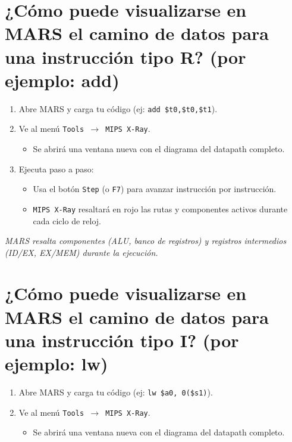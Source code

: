 \documentclass{article}
\begin{document}
\begin{itemize}
\begin{itemize}[label=--]
\begin{enumerate}[leftmargin=*]
\end{enumerate}

\section{¿Cómo puede visualizarse en MARS el camino de datos para una instrucción tipo R? (por ejemplo: add)}

\begin{enumerate}
    \item Abre MARS y carga tu código (ej: \texttt{add \$t0,\$t0,\$t1}).
    
    \item Ve al menú \texttt{Tools $\rightarrow$ MIPS X-Ray}.
    
    \begin{itemize}
        \item Se abrirá una ventana nueva con el diagrama del datapath completo.
    \end{itemize}
    
    \item Ejecuta paso a paso:
    \begin{itemize}
        \item Usa el botón \texttt{Step} (o \texttt{F7}) para avanzar instrucción por instrucción.
        \item \texttt{MIPS X-Ray} resaltará en rojo las rutas y componentes activos durante cada ciclo de reloj.
    \end{itemize}
\end{enumerate}
\textit{MARS resalta componentes (ALU, banco de registros) y registros intermedios (ID/EX, EX/MEM) durante la ejecución.}

\section{¿Cómo puede visualizarse en MARS el camino de datos para una instrucción tipo I? (por ejemplo: lw)}

\begin{enumerate}
    \item Abre MARS y carga tu código (ej: \texttt{lw \$a0, 0(\$s1)}). %
    
    \item Ve al menú \texttt{Tools $\rightarrow$ MIPS X-Ray}.
    
    \begin{itemize}
        \item Se abrirá una ventana nueva con el diagrama del datapath completo.
    \end{itemize}
    

\end{enumerate}
\end{itemize}
\end{itemize}
\end{document}
